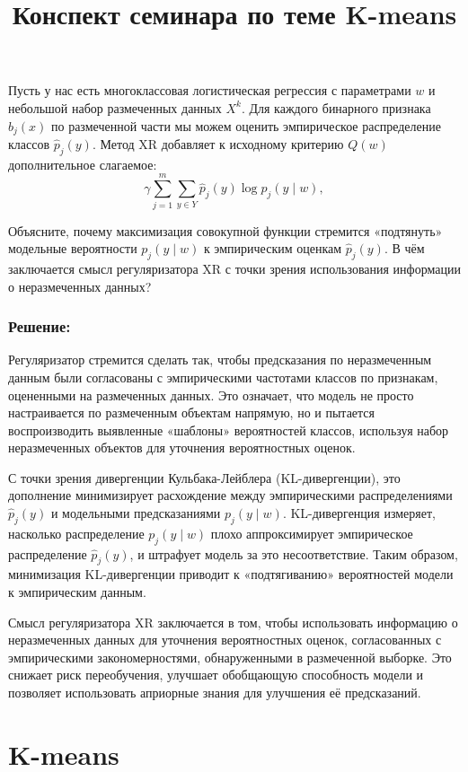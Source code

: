 Пусть у нас есть многоклассовая логистическая регрессия с параметрами $w$ и небольшой набор размеченных данных $X^k$. Для каждого бинарного признака $b_j(x)$ по размеченной части мы можем оценить эмпирическое распределение классов $\hat{p}_j(y)$. Метод XR добавляет к исходному критерию $Q(w)$ дополнительное слагаемое:
\[
    \gamma \sum_{j=1}^m \sum_{y \in Y} \hat{p}_j(y) \log p_j(y \mid w),
\]

Объясните, почему максимизация совокупной функции стремится «подтянуть» модельные вероятности $p_j(y \mid w)$ к эмпирическим оценкам $\hat{p}_j(y)$. В чём заключается смысл регуляризатора XR с точки зрения использования информации о неразмеченных данных?

\subsubsection*{Решение:}
Регуляризатор стремится сделать так, чтобы предсказания по неразмеченным данным были согласованы с эмпирическими частотами классов по признакам, оцененными на размеченных данных. Это означает, что модель не просто настраивается по размеченным объектам напрямую, но и пытается воспроизводить выявленные «шаблоны» вероятностей классов, используя набор неразмеченных объектов для уточнения вероятностных оценок.

С точки зрения дивергенции Кульбака-Лейблера (KL-дивергенции), это дополнение минимизирует расхождение между эмпирическими распределениями $\hat{p}_j(y)$ и модельными предсказаниями $p_j(y \mid w)$. KL-дивергенция измеряет, насколько распределение $p_j(y \mid w)$ плохо аппроксимирует эмпирическое распределение $\hat{p}_j(y)$, и штрафует модель за это несоответствие. Таким образом, минимизация KL-дивергенции приводит к «подтягиванию» вероятностей модели к эмпирическим данным.

Смысл регуляризатора XR заключается в том, чтобы использовать информацию о неразмеченных данных для уточнения вероятностных оценок, согласованных с эмпирическими закономерностями, обнаруженными в размеченной выборке. Это снижает риск переобучения, улучшает обобщающую способность модели и позволяет использовать априорные знания для улучшения её предсказаний.

\section*{K-means}
\title{Конспект семинара по теме K-means}


